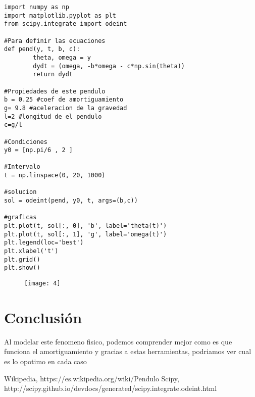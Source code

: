 \documentclass[12pt]{article}
\begin{document}
\begin{verbatim}
import numpy as np
import matplotlib.pyplot as plt
from scipy.integrate import odeint

#Para definir las ecuaciones
def pend(y, t, b, c):
        theta, omega = y
        dydt = (omega, -b*omega - c*np.sin(theta))
        return dydt
    
#Propiedades de este pendulo   
b = 0.25 #coef de amortiguamiento
g= 9.8 #aceleracion de la gravedad
l=2 #longitud de el pendulo
c=g/l

#Condiciones
y0 = [np.pi/6 , 2 ]

#Intervalo
t = np.linspace(0, 20, 1000)

#solucion 
sol = odeint(pend, y0, t, args=(b,c))

#graficas
plt.plot(t, sol[:, 0], 'b', label='theta(t)')
plt.plot(t, sol[:, 1], 'g', label='omega(t)')
plt.legend(loc='best')
plt.xlabel('t')
plt.grid()
plt.show()
\end{verbatim}

\begin{figure}[H]
\centering
\texttt{[image: 4]}
\end{figure}


\section*{Conclusión}
Al modelar este fenomeno fisico, podemos comprender mejor como es que funciona el amortiguamiento y gracias a estas herramientas, podriamos ver cual es lo opotimo en cada caso

\begin{thebibliography}{widestlabel}
	 Wikipedia, https://es.wikipedia.org/wiki/Pendulo
	 Scipy, http://scipy.github.io/devdocs/generated/scipy.integrate.odeint.html
\end{thebibliography}
\end{document}
